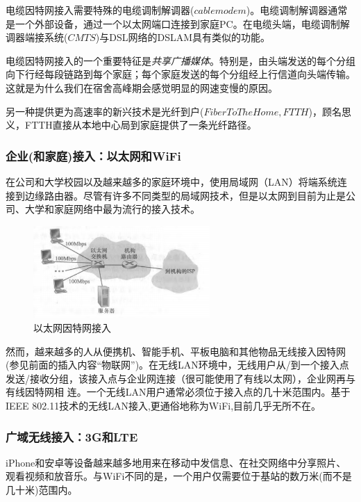     电缆因特网接入需要特殊的电缆调制解调器($cable modem$)。电缆调制解调器通常是一个外部设备，通过一个以太网端口连接到家庭PC。在电缆头端，电缆调制解调器端接系统($CMTS$)与DSL网络的DSLAM具有类似的功能。

    电缆因特网接入的一个重要特征是\emph{共享广播媒体}。特别是，由头端发送的每个分组向下行经每段链路到每个家庭；每个家庭发送的每个分组经上行信道向头端传输。这就是为什么我们在宿舍高峰期会感觉明显的网速变慢的原因。

    另一种提供更为高速率的新兴技术是光纤到户($Fiber To The Home, FTTH$)，顾名思义，FTTH直接从本地中心局到家庭提供了一条光纤路径。

\subsubsection{企业(和家庭)接入：以太网和WiFi}

    在公司和大学校园以及越来越多的家庭环境中，使用局域网（LAN）将端系统连接到边缘路由器。尽管有许多不同类型的局域网技术，但是以太网到目前为止是公司、大学和家庭网络中最为流行的接入技术。

\begin{figure}[!htbp]
    \centering
    \includegraphics[width=0.6\textwidth]{image/chapter01/以太网接入.png}
    \caption{以太网因特网接入}
\end{figure}

    然而，越来越多的人从便携机、智能手机、平板电脑和其他物品无线接入因特网(参见前面的插入内容“物联网”)。在无线LAN环境中，无线用户从/到一个接入点发送/接收分组，该接入点与企业网连接（很可能使用了有线以太网），企业网再与有线因特网相
连。一个无线LAN用户通常必须位于接入点的几十米范围内。基于IEEE 802.11技术的无线LAN接入,更通俗地称为WiFi,目前几乎无所不在。

\subsubsection{广域无线接入：3G和LTE}

    iPhone和安卓等设备越来越多地用来在移动中发信息、在社交网络中分享照片、观看视频和放音乐。与WiFi不同的是，一个用户仅需要位于基站的数万米(而不是几十米)范围内。

